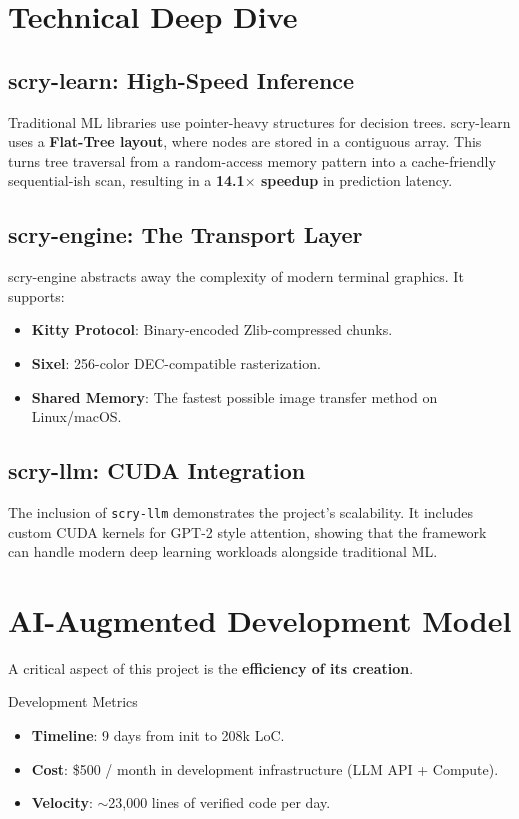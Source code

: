 \documentclass[11pt,a4paper]{article}
\begin{document}
\section{Technical Deep Dive}

\subsection{scry-learn: High-Speed Inference}
Traditional ML libraries use pointer-heavy structures for decision trees. scry-learn uses a \textbf{Flat-Tree layout}, where nodes are stored in a contiguous array. This turns tree traversal from a random-access memory pattern into a cache-friendly sequential-ish scan, resulting in a \textbf{14.1$\times$ speedup} in prediction latency.

\subsection{scry-engine: The Transport Layer}
scry-engine abstracts away the complexity of modern terminal graphics. It supports:
\begin{itemize}
    \item \textbf{Kitty Protocol}: Binary-encoded Zlib-compressed chunks.
    \item \textbf{Sixel}: 256-color DEC-compatible rasterization.
    \item \textbf{Shared Memory}: The fastest possible image transfer method on Linux/macOS.
\end{itemize}

\subsection{scry-llm: CUDA Integration}
The inclusion of \texttt{scry-llm} demonstrates the project's scalability. It includes custom CUDA kernels for GPT-2 style attention, showing that the framework can handle modern deep learning workloads alongside traditional ML.

\section{AI-Augmented Development Model}

A critical aspect of this project is the \textbf{efficiency of its creation}. 

\begin{googlebox}{Development Metrics}
\begin{itemize}
    \item \textbf{Timeline}: 9 days from init to 208k LoC.
    \item \textbf{Cost}: \$500 / month in development infrastructure (LLM API + Compute).
    \item \textbf{Velocity}: $\sim$23,000 lines of verified code per day.
\end{itemize}
\end{googlebox}
\end{document}

